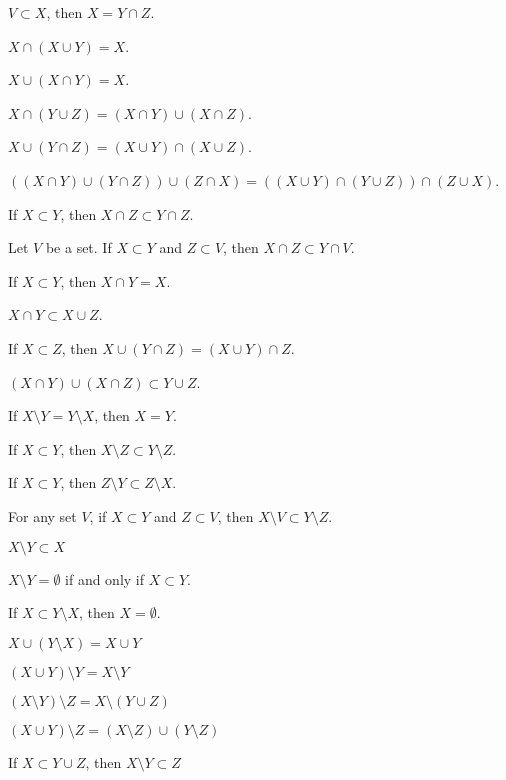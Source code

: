 \documentclass{article}
\begin{document}
\begin{thm}
  $V\subset X$, then $X=Y\cap Z$.
\item\label{xboole1:21} $X\cap(X\cup Y)=X$.
\item\label{xboole1:22} $X\cup(X\cap Y)=X$.
\item\label{xboole1:23} $X\cap(Y\cup Z)=(X\cap Y)\cup (X\cap Z)$.
\item\label{xboole1:24} $X\cup(Y\cap Z)=(X\cup Y)\cap(X\cup Z)$.
\item\label{xboole1:25} $((X \cap Y) \cup (Y \cap Z)) \cup (Z \cap X) = ((X \cup Y) \cap (Y \cup Z)) \cap (Z \cup X)$.
\item\label{xboole1:26} If $X\subset Y$, then $X\cap Z\subset Y\cap Z$.
\item\label{xboole1:27} Let $V$ be a set. If $X\subset Y$ and $Z\subset V$,
  then $X\cap Z\subset Y\cap V$.
\item\label{xboole1:28} If $X\subset Y$, then $X\cap Y=X$.
\item\label{xboole1:29} $X\cap Y\subset X\cup Z$.
\item\label{xboole1:30} If $X\subset Z$, then $X \cup (Y \cap Z) = (X \cup Y) \cap Z$.
\item\label{xboole1:31} $(X \cap Y) \cup (X \cap Z) \subset Y \cup Z$.
\item\label{xboole1:32} If $X\setminus Y=Y\setminus X$, then $X=Y$.
\item\label{xboole1:33} If $X\subset Y$, then $X\setminus Z\subset Y\setminus Z$.
\item\label{xboole1:34} If $X\subset Y$, then $Z\setminus Y\subset Z\setminus X$.
\item\label{xboole1:35} For any set $V$, if $X\subset Y$ and $Z\subset V$,
  then $X\setminus V\subset Y\setminus Z$.
\item\label{xboole1:36} $X\setminus Y\subset X$
\item\label{xboole1:37} $X\setminus Y=\emptyset$ if and only if
  $X\subset Y$.
\item\label{xboole1:38} If $X\subset Y\setminus X$, then $X=\emptyset$.
\item\label{xboole1:39} $X \cup (Y \setminus X) = X \cup Y$
\item\label{xboole1:40} $(X \cup Y) \setminus Y = X \setminus Y$
\item\label{xboole1:41} $(X \setminus Y) \setminus Z = X \setminus (Y \cup Z)$
\item\label{xboole1:42} $(X \cup Y) \setminus Z = (X \setminus Z) \cup (Y \setminus Z)$
\item\label{xboole1:43} If $X\subset Y \cup Z$, then $X \setminus Y \subset Z$

\end{thm}
\end{document}
